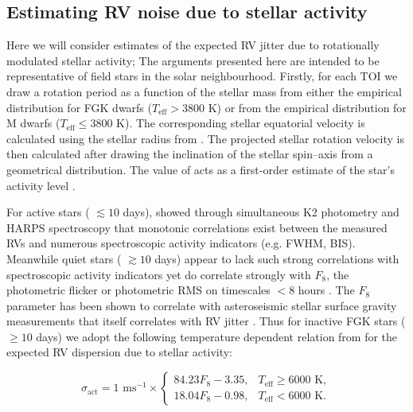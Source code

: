 \subsection{Estimating RV noise due to stellar activity} \label{sect:act}
Here we will consider estimates of the expected RV jitter due to rotationally modulated stellar
activity;  The arguments presented here are intended to be
representative of field stars in the
solar neighbourhood. Firstly, for each TOI we draw a rotation period \prot{} as a function of the stellar
mass from either the \cite{pizzolato03} empirical distribution for FGK dwarfs ($T_{\text{eff}} > 3800$ K) or from
the \cite{newton16a} empirical distribution for M dwarfs ($T_{\text{eff}} \leq 3800$ K). The corresponding
stellar equatorial velocity is calculated using the stellar radius from . The projected
stellar rotation velocity \vsini{} is then calculated after drawing the inclination of the stellar spin--axis
from a geometrical distribution. The value of \vsini{} acts as a first-order estimate of the star's activity
level \citep[e.g.][]{west15, moutou17}.

For active stars
(\prot{} $\lesssim 10$ days), \cite{oshagh17} showed through simultaneous
K2 photometry and HARPS spectroscopy that monotonic correlations exist between the measured RVs and numerous
spectroscopic activity indicators (e.g. \Rhk{,} FWHM, BIS). Meanwhile quiet stars
(\prot{} $\gtrsim 10$ days) appear to lack such strong
correlations with spectroscopic activity indicators yet do correlate strongly with $F_8$, the photometric
flicker or photometric RMS on timescales $<8$ hours \citep{bastien13}. The $F_8$ parameter has been shown to
correlate with asteroseismic stellar surface gravity measurements \citep{bastien13} that itself correlates
with RV jitter \citep{bastien14}. Thus for inactive FGK stars (\prot{} $\geq 10$ days)
we adopt the following temperature dependent
relation from \cite{cegla14} for the expected RV dispersion due to stellar activity:

\begin{equation}
  \sigma_{\text{act}} = 1 \text{ m} \text{s}^{-1} \times
  \begin{cases}
    84.23 F_8 - 3.35, & T_{\text{eff}} \geq 6000 \text{ K}, \\
    18.04 F_8 - 0.98, & T_{\text{eff}} < 6000 \text{ K}.
  \end{cases} \label{eq:cegla}
\end{equation}

